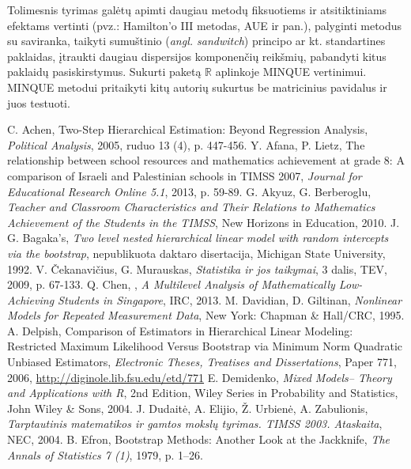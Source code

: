\documentclass[11pt,a4paper]{article}
\newcommand{\R}{{\mathbb R}}
\begin{document}
\indent Tolimesnis tyrimas galėtų apimti daugiau metodų fiksuotiems ir atsitiktiniams efektams vertinti (pvz.: Hamilton'o III metodas, AUE ir pan.), palyginti metodus su saviranka, taikyti sumuštinio (\textit{angl. sandwitch}) principo ar kt. standartines paklaidas, įtraukti daugiau dispersijos komponenčių reikšmių, pabandyti kitus paklaidų pasiskirstymus. Sukurti paketą $\R$ aplinkoje MINQUE vertinimui. MINQUE metodui pritaikyti kitų autorių sukurtus be matricinius pavidalus ir juos testuoti.


\newpage
\renewcommand\refname{LITERATŪRA IR ŠALTINIAI}
\begin{thebibliography}{1}
 C. Achen, Two-Step Hierarchical Estimation: Beyond Regression Analysis,  \textit{Political Analysis}, 2005, ruduo 13 (4), p. 447-456.
 Y. Afana,  P. Lietz, The relationship between school resources and mathematics achievement at grade 8: A comparison of Israeli and Palestinian schools in TIMSS 2007, \textit{Journal for Educational Research Online 5.1}, 2013, p. 59-89.
 G. Akyuz, G. Berberoglu, \textit{Teacher and Classroom Characteristics and Their Relations to Mathematics Achievement of the Students in the TIMSS}, New Horizons in Education, 2010.
J. G. Bagaka's, \textit{Two level nested hierarchical linear model with random intercepts via the bootstrap}, nepublikuota daktaro disertacija, Michigan State University, 1992.
 V. Čekanavičius, G. Murauskas, \textit{Statistika ir jos taikymai}, 3 dalis, TEV, 2009, p. 67-133.
 Q. Chen, , \textit{A Multilevel Analysis of Mathematically Low-Achieving Students in Singapore}, IRC, 2013.
M. Davidian, D. Giltinan, \textit{Nonlinear Models for Repeated Measurement Data}, New York: Chapman \& Hall/CRC, 1995.
 A. Delpish, Comparison of Estimators in Hierarchical Linear Modeling: Restricted Maximum Likelihood Versus Bootstrap via Minimum Norm Quadratic Unbiased Estimators, \textit{Electronic Theses, Treatises and Dissertations}, Paper 771, 2006, \href{http://diginole.lib.fsu.edu/etd/771}{http://diginole.lib.fsu.edu/etd/771}
 E. Demidenko, \textit{Mixed Models– Theory and Applications with R}, 2nd Edition, Wiley Series in Probability and Statistics, John Wiley \& Sons, 2004.
 J. Dudaitė, A. Elijio, Ž. Urbienė, A. Zabulionis, \textit{Tarptautinis matematikos ir gamtos mokslų tyrimas. TIMSS 2003. Ataskaita}, NEC, 2004.
 B. Efron, Bootstrap Methods: Another Look at the Jackknife, \textit{The Annals of Statistics 7 (1)}, 1979, p. 1–26.

\end{thebibliography}
\end{document}
